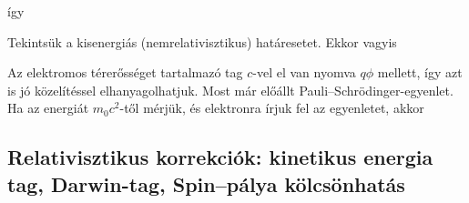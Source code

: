    így
   
   Tekintsük a kisenergiás (nemrelativisztikus) határesetet.
   Ekkor
   vagyis
   
   Az elektromos térerősséget tartalmazó tag $c$-vel el van nyomva $q\phi$ mellett, így azt is jó közelítéssel elhanyagolhatjuk.
   Most már előállt Pauli--Schrödinger-egyenlet.
   Ha az energiát $m_0c^2$-től mérjük, és elektronra írjuk fel az egyenletet, akkor 
   
  \subsection{Relativisztikus korrekciók: kinetikus energia tag, Darwin-tag, Spin--pálya kölcsönhatás}
   
